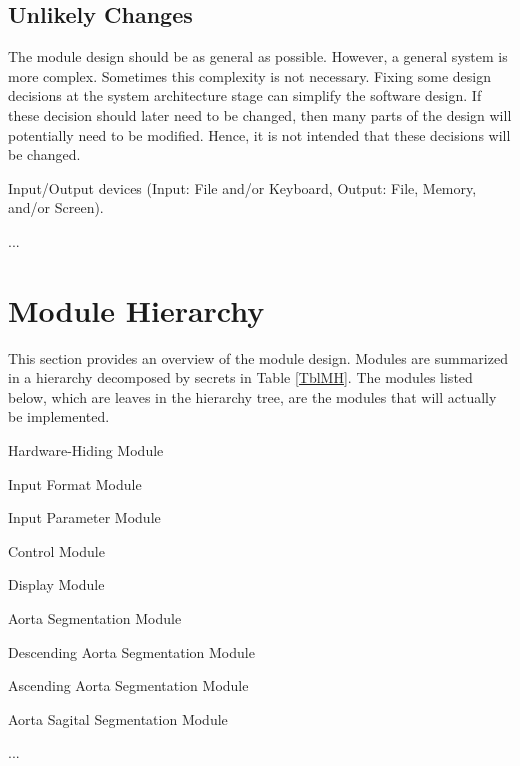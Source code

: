 \documentclass[12pt, titlepage]{article}
\newcounter{ucnum}
\newcommand{\uctheucnum}{UC\theucnum}
\newcounter{mnum}
\newcommand{\mthemnum}{M\themnum}
\begin{document}
\subsection{Unlikely Changes} \label{SecUchange}

The module design should be as general as possible. However, a general system is
more complex. Sometimes this complexity is not necessary. Fixing some design
decisions at the system architecture stage can simplify the software design. If
these decision should later need to be changed, then many parts of the design
will potentially need to be modified. Hence, it is not intended that these
decisions will be changed.

\begin{description}
\item[ \uctheucnum \label{ucIO}:] Input/Output devices
  (Input: File and/or Keyboard, Output: File, Memory, and/or Screen).
\item ...
\end{description}

\section{Module Hierarchy} \label{SecMH}

This section provides an overview of the module design. Modules are summarized
in a hierarchy decomposed by secrets in Table \ref{TblMH}. The modules listed
below, which are leaves in the hierarchy tree, are the modules that will
actually be implemented.

\begin{description}
\item [ \mthemnum \label{mHH}:] Hardware-Hiding Module
\item [ \mthemnum \label{mInput}:] Input Format Module
\item [ \mthemnum \label{mParams}:] Input Parameter Module
\item [ \mthemnum \label{mControl}:] Control Module
\item [ \mthemnum \label{mDisplay}:] Display Module
\item [ \mthemnum \label{mAortaSeg}:] Aorta Segmentation Module
\item [ \mthemnum \label{mDAS}:] Descending Aorta Segmentation Module
\item [ \mthemnum \label{mAAS}:] Ascending Aorta Segmentation Module
\item [ \mthemnum \label{mASS}:] Aorta Sagital Segmentation Module
\item ...
\end{description}
\end{document}
